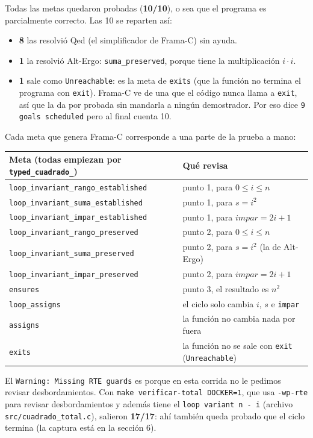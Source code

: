 \documentclass[11pt,letterpaper]{article}
\begin{document}
Todas las metas quedaron probadas (\textbf{10/10}), o sea que el programa es parcialmente correcto. Las 10 se reparten así:
\begin{itemize}
\item \textbf{8} las resolvió Qed (el simplificador de Frama-C) sin ayuda.
\item \textbf{1} la resolvió Alt-Ergo: \texttt{suma\_preserved}, porque tiene la multiplicación $i \cdot i$.
\item \textbf{1} sale como \texttt{Unreachable}: es la meta de \texttt{exits} (que la función no termina el programa con \texttt{exit}). Frama-C ve de una que el código nunca llama a \texttt{exit}, así que la da por probada sin mandarla a ningún demostrador. Por eso dice \texttt{9 goals scheduled} pero al final cuenta 10.
\end{itemize}

Cada meta que genera Frama-C corresponde a una parte de la prueba a mano:

\begin{center}
\begin{tabular}{|l|l|}
\hline
Meta (todas empiezan por \texttt{typed\_cuadrado\_}) & Qué revisa \\
\hline
\texttt{loop\_invariant\_rango\_established} & punto 1, para $0 \le i \le n$ \\
\texttt{loop\_invariant\_suma\_established} & punto 1, para $s = i^2$ \\
\texttt{loop\_invariant\_impar\_established} & punto 1, para $\mathit{impar} = 2i+1$ \\
\texttt{loop\_invariant\_rango\_preserved} & punto 2, para $0 \le i \le n$ \\
\texttt{loop\_invariant\_suma\_preserved} & punto 2, para $s = i^2$ (la de Alt-Ergo) \\
\texttt{loop\_invariant\_impar\_preserved} & punto 2, para $\mathit{impar} = 2i+1$ \\
\texttt{ensures} & punto 3, el resultado es $n^2$ \\
\texttt{loop\_assigns} & el ciclo solo cambia $i$, $s$ e \texttt{impar} \\
\texttt{assigns} & la función no cambia nada por fuera \\
\texttt{exits} & la función no se sale con \texttt{exit} (\texttt{Unreachable}) \\
\hline
\end{tabular}
\end{center}

El \texttt{Warning: Missing RTE guards} es porque en esta corrida no le pedimos revisar desbordamientos. Con \texttt{make verificar-total DOCKER=1}, que usa \texttt{-wp-rte} para revisar desbordamientos y además tiene el \texttt{loop variant n - i} (archivo \texttt{src/cuadrado\_total.c}), salieron \textbf{17/17}: ahí también queda probado que el ciclo termina (la captura está en la sección 6).
\end{document}
